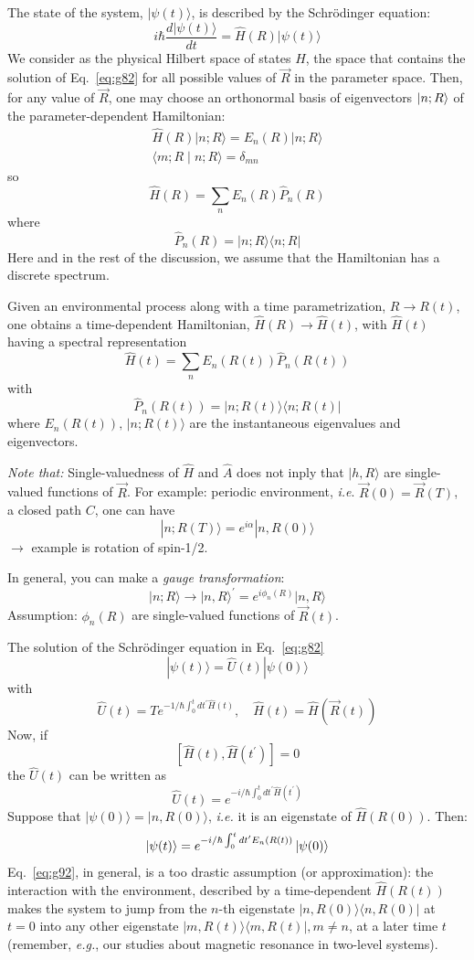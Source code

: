 \documentclass[12pt]{article}
\newcommand{\be}{\begin{equation}}
\newcommand{\ee}{\end{equation}}
\begin{document}
The state of the system, $|\psi(t)\rangle$, is described by the
Schrödinger equation:
\be
i\hbar \frac{d|\psi(t)\rangle}{d t}=\hat{H}(R)|\psi(t)\rangle
\label{eq:g82}
\ee
We consider as the physical Hilbert space of states $H$,
the space that contains the solution of Eq.~\eqref{eq:g82}
for all possible values of $\vec{R}$ in the parameter
space. Then, for any value of $\vec{R}$, one may
choose an orthonormal basis of eigenvectors
$\ket{n;R}$ of the parameter-dependent Hamiltonian:
\be
\begin{gathered}
\hat{H}(R)|n ; R\rangle=E_{n}(R)|n ; R\rangle\\
\langle m ; R \mid n ; R\rangle=\delta_{m n}
\end{gathered}
\label{eq:g83}
\ee
so
\be
\hat{H}(R)=\sum_{n} E_{n}(R) \hat{P}_{n}(R)
\ee
where
\be
\hat{P}_{n}(R)=|n ; R\rangle\langle n ; R|
\ee
Here and in the rest of the discussion, we assume that
the Hamiltonian has a discrete spectrum.


Given an environmental process along with a time
parametrization, $R \rightarrow R(t)$, one obtains a time-dependent
Hamiltonian, $\hat{H}(R) \rightarrow \hat{H}(t)$, with $\hat{H}(t)$ having a
spectral representation
\be
\hat{H}(t)= \sum_n E_{n}(R(t)) \hat{P}_{n}(R(t))
\ee
with
\be
\hat{P}_{n}(R(t))=|n ; R(t)\rangle\langle n ; R(t)|
\ee
where $E_{n}(R(t)),\,|n ; R(t)\rangle$ are the instantaneous eigenvalues
and eigenvectors.

\emph{Note that:} Single-valuedness of $\hat{H}$ and $\hat{A}$ does not
inply that $|h, R\rangle$ are single-valued functions
of $\vec{R}$. For example: periodic environment, \textit{i.e}.
$\vec{R}(0)=\vec{R}(T)$, a closed path $C$, one can have
\be
|n ; R(T)\rangle=e^{i \alpha}|n, R(0)\rangle
\ee
$\rightarrow$ example is rotation of spin-1/2.

In general, you can make a \emph{gauge transformation}:
\be
|n ; R\rangle \rightarrow|n, R\rangle^{\prime}=e^{i \phi_{n}(R)}|n, R\rangle
\label{eq:g89}
\ee
Assumption: $\phi_{n}(R)$ are single-valued functions of $\vec{R}(t)$.


The solution of the Schrödinger equation in Eq.~\eqref{eq:g82}
\be
|\psi(t)\rangle=\hat{U}(t)|\psi(0)\rangle
\ee
with
\be
\hat{U}(t) = T e^{-1 / \hbar \int_{0}^{t} d t^{\prime} \hat{H}(t)}, \quad \hat{H}(t)=\hat{H}(\vec{R}(t))
\ee
Now, if
\be
\left[\hat{H}(t), \hat{H}\left(t^{\prime}\right)\right]=0
\label{eq:g92}
\ee
the $\hat{U}(t)$ can be written as
\be
\hat{U}(t)=e^{-i / \hbar \int_{0}^{t} d t^{\prime} \hat{H}(t^\prime)}
\ee
Suppose that $|\psi(0)\rangle=|n, R(0)\rangle$, \textit{i.e.} it is an
eigenstate of $\hat{H}(R(0))$. Then:
\be
\ket{\psi(t)}=e^{-i / \hbar \int_{0}^{t} d t^{\prime} E_n(R(t))}\ket{\psi(0)}
\ee
Eq.~\eqref{eq:g92}, in general, is a too drastic assumption
(or approximation): the interaction with the environment,
described by a time-dependent $\hat{H}(R(t))$ makes
the system to jump from the $n$-th eigenstate
$|n, R(0)\rangle\langle n, R(0)|$ at $t=0$ into any other eigenstate
$|m, R(t)\rangle\langle m, R(t)|, m \neq n$, at a later time $t$
(remember, \textit{e.g.}, our studies about magnetic resonance in two-level systems).
\end{document}
